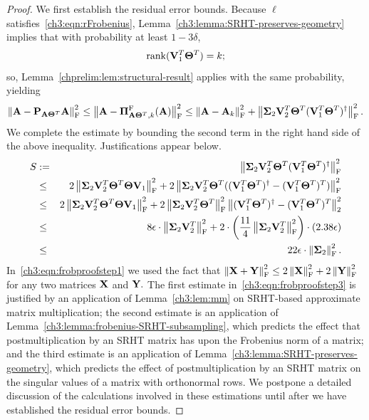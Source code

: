 \begin{proof}
We first establish the residual error bounds.
Because $\ell$ satisfies~\eqref{ch3:eqn:rFrobenius}, Lemma~\ref{ch3:lemma:SRHT-preserves-geometry} implies 
that with probability at least $1-3\delta$,
$$\mathrm{rank}(\mathbf{V}_1^T \mathbf{\Theta}^T) = k;$$
so, Lemma~\ref{chprelim:lem:structural-result} applies with 
the same probability, yielding
\begin{equation}
\label{ch3:eqn:frobenius-application-of-structural-result}
\left\|\mathbf{A} - \mathbf{P}_{\mathbf{A} \mathbf{\Theta}^T} \mathbf{A} \right\|_\mathrm{F}^2 \le  
\big\|\mathbf{A} - \boldsymbol{\Pi}_{\mathbf{A} \mathbf{\Theta}^T,k}^{\mathrm{F}}(\mathbf{A}) \big\|_{\mathrm{F}}^2 \le
\left\|\mathbf{A} - \mathbf{A}_k \right\|_\mathrm{F}^2 + 
 \left\|\mathbf{\Sigma}_2 \mathbf{V}_2 ^T \mathbf{\Theta}^T 
  (\mathbf{V}_1^T \mathbf{\Theta}^T)^\dagger\right\|_\mathrm{F}^2.
\end{equation}
We complete the estimate by bounding the second term in the right hand side of the above inequality.
Justifications appear below.
%
\begin{eqnarray}
 S &:=& \left\|\mathbf{\Sigma}_2 \mathbf{V}_2 ^T  \mathbf{\Theta}^T 
                (\mathbf{V}_1 ^T \mathbf{\Theta}^T)^\dagger \right\|_\mathrm{F}^2 \notag \\
&\leq&  2 \left\|\mathbf{\Sigma}_2 \mathbf{V}_2 ^T \mathbf{\Theta}^T \mathbf{\Theta} \mathbf{V}_1\right\|_\mathrm{F}^2 +
2\left\|\mathbf{\Sigma}_2 \mathbf{V}_2^T \mathbf{\Theta}^T  
 ((\mathbf{V}_1^T \mathbf{\Theta}^T)^\dagger - 
  (\mathbf{V}_1^T \mathbf{\Theta}^T)^T )\right\|_\mathrm{F}^2 \label{ch3:eqn:frobproofstep1} \\
&\leq& 2\left\|\mathbf{\Sigma}_2 \mathbf{V}_2 ^T \mathbf{\Theta}^T \mathbf{\Theta}\mathbf{V}_1\right\|_\mathrm{F}^2 +
2\left\|\mathbf{\Sigma}_2 \mathbf{V}_2 ^T \mathbf{\Theta}^T\right\|_\mathrm{F}^2 
 \left\| (\mathbf{V}_1^T \mathbf{\Theta}^T)^\dagger - 
          (\mathbf{V}_1^T \mathbf{\Theta}^T)^T\right\|_2^2  \notag \\
&\leq&
 8 \epsilon \cdot \left\|\mathbf{\Sigma}_2 \mathbf{V}_2 ^T  \right\|_\mathrm{F}^2  +
2\cdot  \left( \frac{11}{4} \left\|\mathbf{\Sigma}_2 \mathbf{V}_2^T\right\|_\mathrm{F}^2 \right) 
 \cdot \left( 2.38 \epsilon \right) \label{ch3:eqn:frobproofstep3} \\
&\leq&  22 \epsilon \cdot \left\|\mathbf{\Sigma}_2\right\|_\mathrm{F}^2. \label{ch3:eqn:frobproofstep4}
\end{eqnarray}
%
In~\eqref{ch3:eqn:frobproofstep1} we used the fact that 
$\left\|\mathbf{X}+\mathbf{Y}\right\|_\mathrm{F}^2 \le 2 \left\|\mathbf{X}\right\|_\mathrm{F}^2 + 2 \left\|\mathbf{Y}\right\|_\mathrm{F}^2$
for any two matrices $\mathbf{X}$ and $\mathbf{Y}.$
The first estimate in~\eqref{ch3:eqn:frobproofstep3} is justified by an application
of Lemma~\ref{ch3:lem:mm} on SRHT-based approximate matrix multiplication; the
second estimate is an application of Lemma~\ref{ch3:lemma:frobenius-SRHT-subsampling},
which predicts the effect that postmultiplication by an SRHT matrix has upon
 the Frobenius norm of a matrix; and the third estimate is an application of
 Lemma~\ref{ch3:lemma:SRHT-preserves-geometry}, which predicts the effect
 of postmultiplication by an SRHT matrix on the singular values of a matrix
 with orthonormal rows. We postpone a detailed discussion of the calculations
 involved in these estimations until after we have established the residual
 error bounds.


\end{proof}
